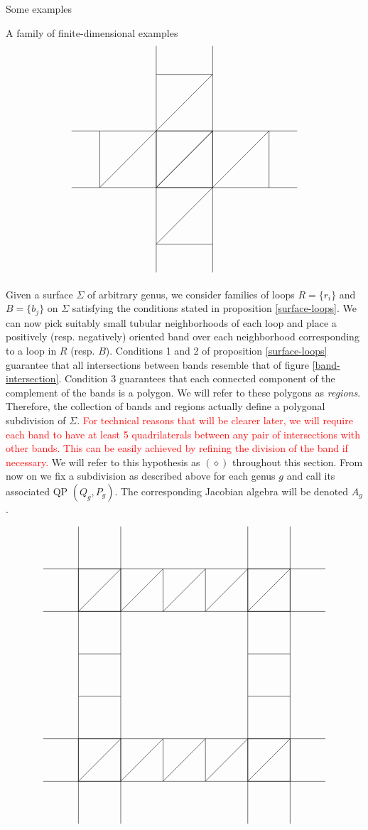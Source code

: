 \begin{chapter}{Some examples}
\begin{section}{A family of finite-dimensional examples}
\[
\label{band-intersection}
\begin{tikzpicture}
\draw (-4,-1) -- (4,-1);
\draw (-4,1) -- (4,1);
\draw (-1,4) -- (-1,-4);
\draw (1,-4) -- (1,4);
\foreach \x in {-3,-1,...,3}
{
\draw (\x,-1) -- (\x, 1);
\draw (-1,\x) -- (1,\x);
}
\foreach \x in {-3,-1,1}
{
\draw (\x,-1) -- (\x+2,1);
\draw (-1,\x) -- (1,\x+2);
}
\end{tikzpicture}
\]

Given a surface $\Sigma$ of arbitrary genus, we consider families of loops $R=\{r_i\}$ and $B=\{b_j\}$ on $\Sigma$ satisfying the conditions stated in proposition \ref{surface-loops}. We can now pick suitably small tubular neighborhoods of each loop and place a positively (resp. negatively) oriented band over each neighborhood corresponding to a loop in $R$ (resp. $B$). Conditions 1 and 2 of proposition \ref{surface-loops} guarantee that all intersections between bands resemble that of figure \ref{band-intersection}. Condition 3 guarantees that each connected component of the complement of the bands is a polygon. We will refer to these polygons as \emph{regions}. Therefore, the collection of bands and regions actually define a polygonal subdivision of $\Sigma$. \textcolor{red}{For technical reasons that will be clearer later, we will require each band to have at least 5 quadrilaterals between any pair of intersections with other bands. This can be easily achieved by refining the division of the band if necessary.} We will refer to this hypothesis as $(\diamond)$ throughout this section. From now on we fix a subdivision as described above for each genus $g$ and call its associated QP $(Q_g,P_g)$. The corresponding Jacobian algebra will be denoted $A_g$.

\begin{figure}[h]
\[
\begin{tikzpicture}
\draw (-5, .75) -- (5, .75);
\draw (-5, -.75) -- (5, -.75);
\draw (-5, -5.25) -- (5, -5.25);
\draw (-5, -6.75) -- (5, -6.75);
\draw (-2.25, -8.25) -- (-2.25, 2.25);
\draw (-3.75, -8.25) -- (-3.75, 2.25);
\draw (2.25, -8.25) -- (2.25, 2.25);
\draw (3.75, -8.25) -- (3.75, 2.25);

\foreach \x in {-3.75,-2.25,...,3.75}
{
\draw (\x, .75) -- (\x, -.75);
\draw (\x, -5.25) -- (\x, -6.75);
}

\foreach \x in {-6.75,-5.25,...,1.75}
{
\draw (-3.75, \x) -- (-2.25, \x);
\draw (3.75, \x) -- (2.25, \x);
}

\foreach \x in {-3.75,-2.25,...,2.25}
{
\draw (\x, -.75) -- (\x+1.5, .75);
\draw (\x, -6.75) -- (\x+1.5, -5.25);
}


\end{tikzpicture}\]
\end{figure}
\end{section}
\end{chapter}
